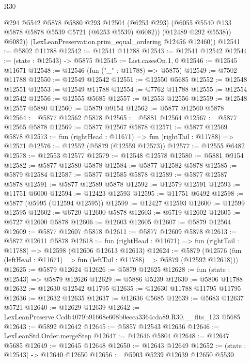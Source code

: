 \begin{lexlean}{R30}
\begin{coremodule}
              @294
              @5542
              @5878
              @5880
              @293
              @12504
              (@6253 @293)
              (@6055 @5540 @133 @5878 @5878 @5539 @5721 (@6253 @5539) @6082))
            (@12489 @292 @5538))
          @6082))
      (LexLeanPreservation.prim_equal_ordering @12456 @12460))
@12541 := @5802 @11788
@12542 := @12541 @11788
@12543 := @12541 @12542
@12544 := (state : @12543) -> @5875
@12545 := List.casesOn.{1, 0}
@12546 := @12545 @11671
@12548 := @12546 (fun ("_" : @11788) => @5875)
@12549 := @7502 @11788
@12550 := @12549 @12542
@12551 := @12550 @5685
@12552 := @12548 @12551
@12553 := @12549 @11788
@12554 := @7762 @11788
@12555 := @12554 @12542
@12556 := @12555 @5685
@12557 := @12553 @12556
@12559 := @12548 @12557 @5880
@12560 := @5879 @9154
@12562 := @5877 @12560 @5878
@12564 := @5877 @12562 @5878
@12565 := @5881 @12564
@12567 := @5877 @12565 @5878
@12569 := @5877 @12567 @5878
@12571 := @5877 @12569 @5878
@12573 := fun (rightHead : @11671) => fun (rightTail : @11788) => @12571
@12576 := @12552 (@5879 (@12559 @12573))
@12577 := @12555 @6482
@12578 := @12553 @12577
@12579 := @12548 @12578
@12580 := @5881 @9154
@12582 := @5877 @12580 @5878
@12584 := @5877 @12582 @5878
@12585 := @5879 @12584
@12587 := @5877 @12585 @5878
@12589 := @5877 @12587 @5878
@12591 := @5877 @12589 @5878
@12592 := @12579 @12591
@12593 := @11751 @6000
@12594 := @12423 @12593
@12595 := @11751 @6492
@12598 := @5877 (@5995 (@12594 @12595))
@12599 := @12427 @12593
@12600 := @12599 @12595
@12602 := @6720 @12600 @5878
@12603 := @6719 @12602
@12605 := @6727 @12600 @5878
@12606 := @12603 @12605
@12607 := @5879 @12564
@12609 := @5877 @12607 @5878
@12611 := @5877 @12609 @5878
@12613 := @5877 @12611 @5878
@12618 := fun (rightHead : @11671) => fun (rightTail : @11788) => @12598 (@12606 @12613 @12613)
@12624 := @5879
    (@12576 (fun (leftHead : @11671) => fun (leftTail : @11788) => @5879 (@12592 @12618)))
@12625 := @5879 @12624
@12626 := @5879 @12625
@12628 := fun (state : @12543) => @5879 @12626
@12629 := @5886 @5239
@12630 := @5806 @11788
@12632 := @12630 @12542 @11795
@12635 := @12630 @11788 @11795 @11795
@12636 := @12632 @12635
@12637 := @12636 @5685
@12639 := @5683 @12637 @5721
@12640 := @12629 @12639
@12642 := LexLeanPreserve.Ccdb4079b91668e608b0ecca3364cda89.R30.__fits_123 @5685
@12643 := @5892 @12642
@12645 := @5857 @12543 @12636
@12646 := LexLeanStd.Order.mergeStep
@12647 := @12646 @5804
@12648 := @12647 @5685
@12649 := @12645 @12648
@12650 := @12643 @12649
@12652 := (state : @12543) -> @12640 @12650
@12656 := @5903 @5239 @12639 @12650 @5530

\end{coremodule}
\end{lexlean}
